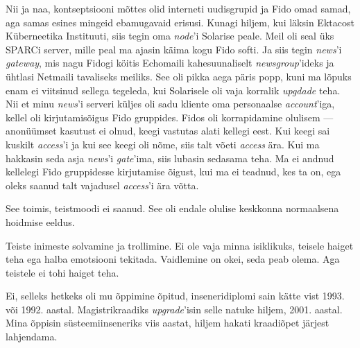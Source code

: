 Nii ja naa, kontseptsiooni mõttes olid interneti uudisgrupid ja Fido omad 
samad, aga samas esines mingeid ebamugavaid erisusi. Kunagi hiljem, kui läksin
Ektacost Küberneetika Instituuti, siis tegin oma 
\emph{node}'i Solarise peale. Meil oli seal üks 
SPARCi server, mille peal ma ajasin käima kogu Fido softi. 
Ja siis tegin \emph{news}'i \emph{gateway}, 
mis nagu Fidogi köitis Echomaili kahesuunaliselt \emph{newsgroup}'ideks ja 
ühtlasi Netmaili tavaliseks meiliks. See oli pikka aega päris popp, kuni ma lõpuks enam ei viitsinud sellega tegeleda, kui Solarisele oli vaja korralik \emph{upgdade} teha. Nii et minu \emph{news}'i 
serveri küljes oli sadu kliente oma personaalse \emph{account}'iga, kellel oli kirjutamisõigus Fido gruppides. 
Fidos oli korrapidamine olulisem --- anonüümset 
kasutust ei olnud, keegi vastutas alati kellegi eest. Kui keegi sai kuskilt
\emph{access}'i ja kui see keegi oli nõme, siis talt võeti \emph{access} 
ära. Kui ma hakkasin seda asja \emph{news}'i \emph{gate}'ima, siis lubasin sedasama 
teha. Ma ei andnud kellelegi Fido gruppidesse kirjutamise õigust, kui ma 
ei teadnud, kes ta on, ega oleks saanud talt vajadusel \emph{access}'i ära võtta. 


See toimis, teistmoodi ei saanud. See oli endale olulise keskkonna normaalsena hoidmise 
eeldus. 


Teiste inimeste solvamine ja trollimine. Ei ole vaja minna isiklikuks, teisele haiget teha ega halba emotsiooni tekitada. Vaidlemine on okei, seda peab olema. Aga teistele ei tohi haiget teha. 


Ei, selleks hetkeks oli mu õppimine õpitud, inseneridiplomi sain kätte vist 1993. või 1992. aastal. Magistrikraadiks \emph{upgrade}'isin selle natuke 
hiljem, 2001. aastal. Mina õppisin süsteemiinseneriks viis aastat, hiljem 
hakati kraadiõpet järjest lahjendama.  


